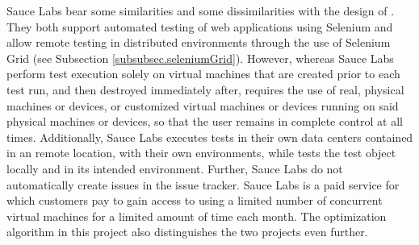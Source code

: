 Sauce Labs bear some similarities and some dissimilarities with the design of \toolname. They both support automated testing of web applications using Selenium and allow remote testing in distributed environments through the use of Selenium Grid (see Subsection \ref{subsubsec.seleniumGrid}). However, whereas Sauce Labs perform test execution solely on virtual machines that are created prior to each test run, and then destroyed immediately after, \toolname \space requires the use of real, physical machines or devices, or customized virtual machines or devices running on said physical machines or devices, so that the user remains in complete control at all times. Additionally, Sauce Labs executes tests in their own data centers contained in an remote location, with their own environments, while \toolname \space tests the test object locally and in its intended environment. Further, Sauce Labs do not automatically create issues in the issue tracker. Sauce Labs is a paid service for which customers pay to gain access to using a limited number of concurrent virtual machines for a limited amount of time each month. The optimization algorithm in this project also distinguishes the two projects even further. %

